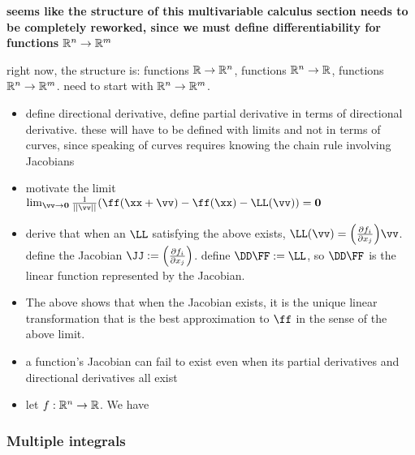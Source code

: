 \begin{deriv}
    \textbf{seems like the structure of this multivariable calculus section needs to be completely reworked, since we must define differentiability for functions $\mathbb{R}^n \rightarrow \mathbb{R}^m$}

    right now, the structure is: functions $\mathbb{R} \rightarrow \mathbb{R}^n$, functions $\mathbb{R}^n \rightarrow \mathbb{R}$, functions $\mathbb{R}^n \rightarrow \mathbb{R}^m$. need to start with $\mathbb{R}^n \rightarrow \mathbb{R}^m$.

    \begin{itemize}
        \item define directional derivative, define partial derivative in terms of directional derivative. these will have to be defined with limits and not in terms of curves, since speaking of curves requires knowing the chain rule involving Jacobians
        \item motivate the limit $\lim_{\vv \rightarrow \mathbf{0}} \frac{1}{||\vv||} (\ff(\xx + \vv) - \ff(\xx) - \LL(\vv)) = \mathbf{0}$
        \item derive that when an $\LL$ satisfying the above exists, $\LL(\vv) = \Big( \frac{\pd f_i}{\pd x_j} \Big) \vv$. define the Jacobian $\JJ := \Big( \frac{\pd f_i}{\pd x_j} \Big)$. define $\DD \FF := \LL$, so $\DD \FF$ is the linear function represented by the Jacobian.
        \item The above shows that when the Jacobian exists, it is the unique linear transformation that is the best approximation to $\ff$ in the sense of the above limit.
        \item a function's Jacobian can fail to exist even when its partial derivatives and directional derivatives all exist
        \item let $f:\mathbb{R}^n \rightarrow \mathbb{R}$. We have 
    \end{itemize}
\end{deriv}

\newpage

\subsubsection*{Multiple integrals}

